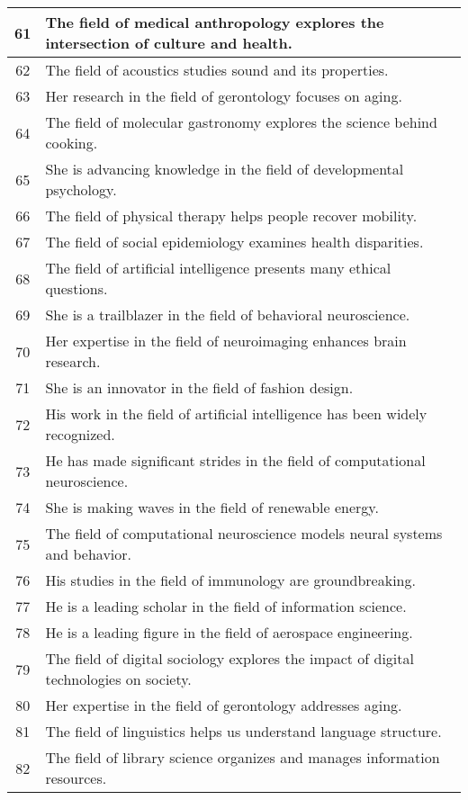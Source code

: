 \begin{longtable}{|c|p{12cm}|}
61 & The field of medical anthropology explores the intersection of culture and health. \\ \hline
62 & The field of acoustics studies sound and its properties. \\ \hline
63 & Her research in the field of gerontology focuses on aging. \\ \hline
64 & The field of molecular gastronomy explores the science behind cooking. \\ \hline
65 & She is advancing knowledge in the field of developmental psychology. \\ \hline
66 & The field of physical therapy helps people recover mobility. \\ \hline
67 & The field of social epidemiology examines health disparities. \\ \hline
68 & The field of artificial intelligence presents many ethical questions. \\ \hline
69 & She is a trailblazer in the field of behavioral neuroscience. \\ \hline
70 & Her expertise in the field of neuroimaging enhances brain research. \\ \hline
71 & She is an innovator in the field of fashion design. \\ \hline
72 & His work in the field of artificial intelligence has been widely recognized. \\ \hline
73 & He has made significant strides in the field of computational neuroscience. \\ \hline
74 & She is making waves in the field of renewable energy. \\ \hline
75 & The field of computational neuroscience models neural systems and behavior. \\ \hline
76 & His studies in the field of immunology are groundbreaking. \\ \hline
77 & He is a leading scholar in the field of information science. \\ \hline
78 & He is a leading figure in the field of aerospace engineering. \\ \hline
79 & The field of digital sociology explores the impact of digital technologies on society. \\ \hline
80 & Her expertise in the field of gerontology addresses aging. \\ \hline
81 & The field of linguistics helps us understand language structure. \\ \hline
82 & The field of library science organizes and manages information resources. \\ \hline

\end{longtable}
